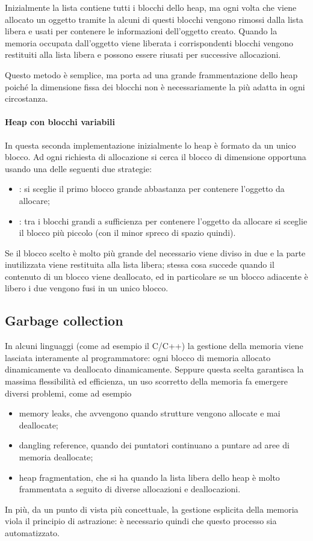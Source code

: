 Inizialmente la lista contiene tutti i blocchi dello heap, ma ogni volta che viene allocato un oggetto tramite la  alcuni di questi blocchi vengono rimossi dalla lista libera e usati per contenere le informazioni dell'oggetto creato. Quando la memoria occupata dall'oggetto viene liberata i corrispondenti blocchi vengono restituiti alla lista libera e possono essere riusati per successive allocazioni.

Questo metodo è semplice, ma porta ad una grande frammentazione dello heap poiché la dimensione fissa dei blocchi non è necessariamente la più adatta in ogni circostanza.

\paragraph{Heap con blocchi variabili} In questa seconda implementazione inizialmente lo heap è formato da un unico blocco. Ad ogni richiesta di allocazione si cerca il blocco di dimensione opportuna usando una delle seguenti due strategie:
\begin{itemize}
    \item {}: si sceglie il primo blocco grande abbastanza per contenere l'oggetto da allocare;
    \item {}: tra i blocchi grandi a sufficienza per contenere l'oggetto da allocare si sceglie il blocco più piccolo (con il minor spreco di spazio quindi).
\end{itemize}
Se il blocco scelto è molto più grande del necessario viene diviso in due e la parte inutilizzata viene restituita alla lista libera; stessa cosa succede quando il contenuto di un blocco viene deallocato, ed in particolare se un blocco adiacente è libero i due vengono fusi in un unico blocco.

\subsection*{Garbage collection}

In alcuni linguaggi (come ad esempio il C/C++) la gestione della memoria viene lasciata interamente al programmatore: ogni blocco di memoria allocato dinamicamente va deallocato dinamicamente. Seppure questa scelta garantisca la massima flessibilità ed efficienza, un uso scorretto della memoria fa emergere diversi problemi, come ad esempio
\begin{itemize}
    \item memory leaks, che avvengono quando strutture vengono allocate e mai deallocate;
    \item dangling reference, quando dei puntatori continuano a puntare ad aree di memoria deallocate;
    \item heap fragmentation, che si ha quando la lista libera dello heap è molto frammentata a seguito di diverse allocazioni e deallocazioni.
\end{itemize}
In più, da un punto di vista più concettuale, la gestione esplicita della memoria viola il principio di astrazione: è necessario quindi che questo processo sia automatizzato.


